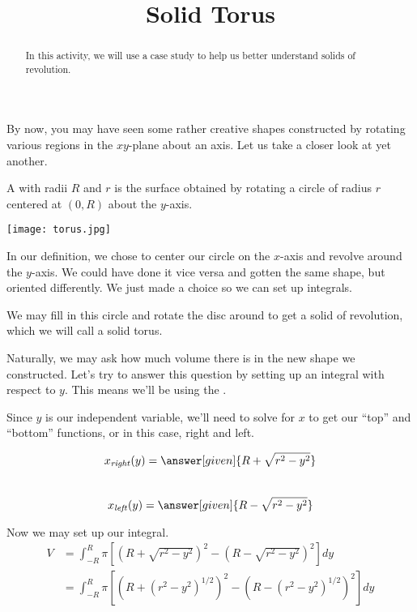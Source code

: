 \documentclass{ximera}
\title{Solid Torus}
\begin{document}
\begin{abstract}
In this activity, we will use a case study to help us better understand solids of revolution.
\end{abstract}
\maketitle

By now, you may have seen some rather creative shapes constructed by rotating various regions in the $xy$-plane about an axis. Let us take a closer look at yet another.
\begin{definition}
	A  with radii $R$ and $r$ is the surface obtained by rotating a circle of radius $r$ centered at $(0,R)$ about the $y$-axis.
\end{definition}

\begin{image}
	\label{torus}
	\texttt{[image: torus.jpg]}
\end{image}

\begin{remark}
	In our definition, we chose to center our circle on the $x$-axis and revolve around the $y$-axis. We could have done it vice versa and gotten the same shape, but oriented differently. We just made a choice so we can set up integrals.
\end{remark} 

We may fill in this circle and rotate the disc around to get a solid of revolution, which we will call a solid torus.

\begin{exercise}
	Naturally, we may ask how much volume there is in the new shape we constructed. Let's try to answer this question by setting up an integral with respect to $y$. This means we'll be using the  .
	
	Since $y$ is our independent variable, we'll need to solve for $x$ to get our ``top'' and ``bottom'' functions, or in this case, right and left.
	
	$$x_{\mathit{right}}(y) = \answer[given]{R+\sqrt{r^2-y^2}}$$ \\
	$$x_{\mathit{left}}(y) = \answer[given]{R-\sqrt{r^2-y^2}}$$
	
	Now we may set up our integral.
	\begin{align*}
		V  &= \int_{-R}^{R} \pi [ (R+\sqrt{r^2-y^2})^{2}-(R-\sqrt{r^2-y^2})^{2}] dy \\
		&= \int_{-R}^{R} \pi [ (R+(r^2-y^2)^{1/2})^{2}-(R-(r^2-y^2)^{1/2})^{2}] dy
	\end{align*}

\end{exercise}
\end{document}

